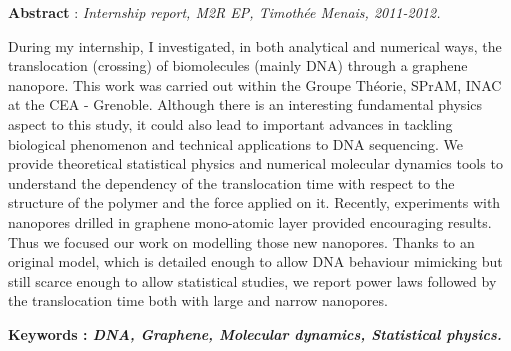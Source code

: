 \documentclass[a4paper,11pt]{article}
\begin{document}
\parbox{15cm}{\small
\textbf{Abstract} : \it Internship report, M2R EP, Timothée Menais, 2011-2012.

\vspace{0.5cm}
\rm During my internship, I investigated, in both analytical and numerical ways, the translocation (crossing) of biomolecules (mainly DNA) through a graphene nanopore. This work was carried out within the Groupe Théorie, SPrAM, INAC at the CEA - Grenoble. Although there is an interesting fundamental physics aspect to this study, it could also lead to important advances in tackling biological phenomenon and technical applications to DNA sequencing. We provide theoretical statistical physics and numerical molecular dynamics tools to understand the dependency of the translocation time with respect to the structure of the polymer and the force applied on it. Recently, experiments with nanopores drilled in graphene mono-atomic layer provided encouraging results. Thus we focused our work on modelling those new nanopores. Thanks to an original model, which is detailed enough to allow DNA behaviour mimicking but still scarce enough to allow statistical studies, we report power laws followed by the translocation time both with large and narrow nanopores.
} %


\vspace{0.5cm}

\parbox{15cm}{
\textbf{Keywords : \it DNA, Graphene, Molecular dynamics, Statistical physics.} }
\end{document}
